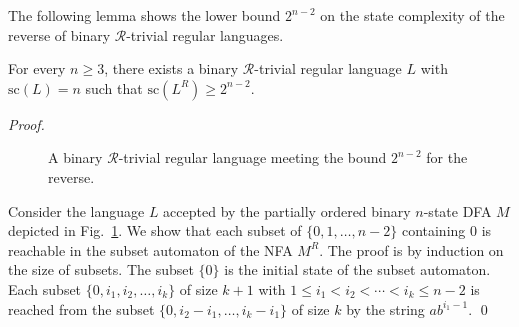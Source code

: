 \documentclass[runningheads]{llncs}
\newcommand{\R}{$\mathcal{R}$}
\renewcommand{\sc}{\mathrm{sc}}
\begin{document}
  The following lemma shows the lower bound $2^{n-2}$
  on the state complexity of the reverse of binary \R-trivial regular languages.

  \begin{lemma}\label{le:binaryRtriv_lower}
    For every $n\ge3$,
    there exists a binary \R-trivial regular language $L$ with $\sc(L)=n$
    such that $\sc(L^R)\ge 2^{n-2}$.
  \end{lemma}
  \begin{proof}
    \begin{figure}[t]
      \centering
      \caption{A binary \R-trivial regular language meeting the bound $2^{n-2}$ for the reverse.}
      \label{fi:binaryRtriv}
    \end{figure}
    Consider the language $L$
    accepted by the partially ordered binary \mbox{$n$-state} DFA $M$
    depicted in Fig.~\ref{fi:binaryRtriv}.
    We show that 
    each subset of $\{0,1,\ldots,n-2\}$ containing $0$
    is reachable in the subset automaton of the NFA $M^R$.
    The proof is by induction on the size of subsets.
    The subset $\{0\}$ is the initial state of the subset automaton.
    Each subset $\{0,i_1,i_2,\ldots,i_k\}$ of size $k+1$ 
    with $1\le i_1 < i_2 < \cdots <i_k \le n-2$
    is reached from the subset $\{0,i_2-i_1,\ldots,i_k-i_1\}$ of size $k$
    by the string $ab^{i_1-1}$. 
  \qed
  \end{proof}
\end{document}
